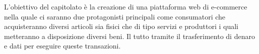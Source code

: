 L’obiettivo del capitolato è la creazione di una piattaforma web di e-commerce nella quale ci saranno due protagonisti principali come consumatori che acquisteranno diversi articoli sia fisici che di tipo servizi e produttori i quali metteranno a disposizione diversi beni. Il tutto tramite il trasferimento di denaro e dati per eseguire queste transazioni.

